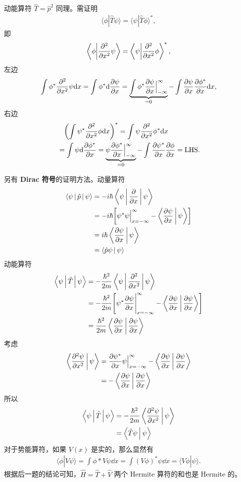 动能算符 $\hat T = \hat p^2$ 同理。需证明
\begin{align}
    \langle\phi| \hat T\psi \rangle = \langle\psi|\hat T\phi\rangle^*,
\end{align}
即
\begin{align}
    \left\langle\phi\middle| \pdv[2]{x}\psi \right\rangle = \left\langle\psi\middle|\pdv[2]{x}\phi\right\rangle^*,
\end{align}
左边
\begin{align}
    \int \phi^* \pdv[2]{x} \psi \mathrm{d} x = 
    \int \phi^* \mathrm{d} \pdv{\psi}{x} =
    \underbrace{\int \phi^* \pdv{\psi}{x} \Big|_{-\infty}^{\infty}}_{=0} - \int \pdv{\psi}{x} \pdv{\phi^*}{x} \mathrm{d} x,
\end{align}
右边
\begin{align}
    &\phantom{=}\left(\int\psi^* \pdv[2]{x}\phi\mathrm{d} x\right)^* = \int \psi \pdv[2]{x}\phi^* \mathrm{d} x \\
    &=\int \psi \mathrm{d} \pdv{\phi^*}{x} = 
    \underbrace{\psi \pdv{\phi^*}{x} \Big|_{-\infty}^{\infty}}_{=0} - \int \pdv{\psi^*}{x} \pdv{\phi}{x} = \text{LHS}.
\end{align}

另有 \textbf{Dirac 符号}的证明方法。动量算符\begin{align}
	\Braket{\psi | \hat p | \psi} &= -i\hbar \Braket{\psi | \pdv{x} | \psi} \notag\\
	&= -i\hbar \qty[\psi^* \psi \Big|_{x=-\infty}^\infty - \Braket{\pdv{\psi}{x} | \psi} ] \notag\\
	&= i\hbar \Braket{\pdv{\psi}{x} | \psi}  \notag\\
	&= \Braket{\hat p \psi | \psi}
	\end{align}
动能算符
	\begin{align}
	\Braket{\psi | \hat T | \psi} &= -\dfrac{\hbar^2}{2m} \Braket{\psi | \pdv[2]{x} | \psi} \notag\\
	&= -\dfrac{\hbar^2}{2m} \qty[\psi^*\pdv{\psi}{x} \Bigg|_{x=-\infty}^\infty - \Braket{\pdv{\psi}{x} | \pdv{\psi}{x}}] \notag\\
	&= \dfrac{\hbar^2}{2m} \Braket{\pdv{\psi}{x} | \pdv{\psi}{x}}
	\end{align}
考虑
	\begin{align}
	\Braket{\pdv[2]{\psi}{x} | \psi} &= \pdv{\psi^*}{x}\psi \Big|_{x=-\infty}^\infty - \Braket{\pdv{\psi}{x} | \pdv{\psi}{x}} \notag\\
	&= - \Braket{\pdv{\psi}{x} | \pdv{\psi}{x}}
	\end{align}
所以
	\begin{align}
	\Braket{\psi | \hat T | \psi} &= -\dfrac{\hbar^2}{2m}\Braket{\pdv[2]{\psi}{x} | \psi} \notag\\
	&= \Braket{\hat T \psi | \psi}
	\end{align}
对于势能算符，如果 $V(x)$ 是实的，那么显然有
\begin{align}
    \langle\phi | V\psi\rangle = \int \phi* V \psi \dd x = \int (V \phi)^* \psi \dd x = \langle V\phi | \psi\rangle.
\end{align}
根据后一题的结论可知，$\hat H = \hat T + \hat V$ 两个 Hermite 算符的和也是 Hermite 的。

